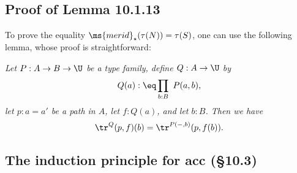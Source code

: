 \documentclass[12pt]{article}
\begin{document}
\begin{comment}

This is about the sentence ``The obvious candidate for the coequalizer of the kernel pair of $f:A\to B$ is the image of f, as defined in \S7.6'' a few paragraphs before Lemma 10.1.1. (It's clear from the context that $A$ and $B$ are sets.) Let's show that this obvious candidate is the good one. It suffices to prove the statement

Let $A$ and $B$ be sets, let $f:A\to B$ be a surjection, define the equivalence relation $\sim$ on $A$ by 
$$
a\sim a'\text{ if and only if }f(a)=f(a'),
$$
let $A/\!\!\sim$ be the quotient as defined at the beginning of \S6.10, and let $q:A\to A/\!\!\sim$ be the canonical projection. Then there is a map $g:B\to A/\!\!\sim$ such that $g\ci f=q$:
$$
\xymatrix{
&A\ar[dl]_f\ar[dr]^q\\
B\ar[rr]_g&&A/\!\!\sim.}
$$ 

Proof. Given $b:B$ we define the sets and maps 
$$
\xymatrix{
\fib_f(b)\ar[rr]^{\pr_1}\ar[d]_{\lv-\rv}\ar[dr]^{q_b}&&A\ar[d]^q\\ 
\lV\fib_f(b)\rV\ar[r]_h&\fib_f(b)/\!\!\sim_b\ar[r]_{\ \ k}&A/\!\!\sim}
$$ 
as follows: Let $\sim_b$ be the equivalence relation defined on $\fib_f(b)$ by the requirement that $x\sim_b y$ for all $x,y:\fib_f(b)$, and $q_b$ the canonical projection; and note that $q_b$ induces $h$ and that $q\ci\pr_1$ induces $k$. The above diagram having been constructed, we set $g(b):\eq k(h(x))$, with $x:\lV\fib_f(b)\rV$. The equality $g\ci f=q$ is easily checked. $\square$

\end{comment}


\subsection{Proof of Lemma 10.1.13}

To prove the equality $\ms{merid}_\star(\tau(N))=\tau(S)$, one can use the following lemma, whose proof is straightforward:

\nn{} \emph{Let $P:A\to B\to\U$ be a type family, define $Q:A\to\U$ by 
$$
Q(a):\eq\prod_{b:B}\ P(a,b),
$$ 
let $p:a=a'$ be a path in $A$, let $f:Q(a)$, and let $b:B$. Then we have} 
$$
\tr^Q(p,f)(b)=\tr^{P(-,b)}(p,f(b)).
$$


\subsection{The induction principle for \textsf{acc} (\S10.3)}
\end{document}
